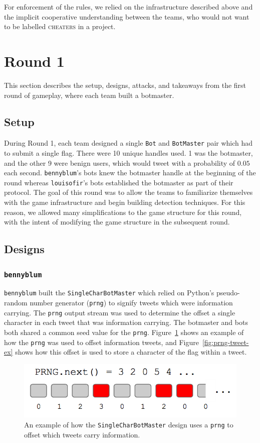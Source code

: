 \documentclass[11pt, oneside]{article} %
\numberwithin{equation}{section} %
\numberwithin{figure}{section} %
\numberwithin{table}{section} %
\renewcommand{\c}[1]{\texttt{#1}}
\newcommand{\teambb}{\c{bennyblum}}
\newcommand{\teamol}{\c{louisofir}}
\begin{document}
		For enforcement of the rules, we relied on the infrastructure described above and the implicit cooperative understanding between the teams, who would not want to be labelled \textsc{cheaters} in a project.

\section{Round 1}
	This section describes the setup, designs, attacks, and takeaways from the first round of gameplay, where each team built a botmaster.

	\subsection{Setup}
		During Round 1, each team designed a single \c{Bot} and \c{BotMaster} pair which had to submit a single flag. There were 10 unique handles used. 1 was the botmaster, and the other 9 were benign users, which would tweet with a probability of $0.05$ each second. \teambb{}'s bots knew the botmaster handle at the beginning of the round whereas \teamol{}'s bots established the botmaster as part of their protocol. The goal of this round was to allow the teams to familiarize themselves with the game infrastructure and begin building detection techniques. For this reason, we allowed many simplifications to the game structure for this round, with the intent of modifying the game structure in the subsequent round. 

	\subsection{Designs}
	
		\subsubsection{\teambb{}}
			\teambb{} built the \c{SingleCharBotMaster} which relied on Python's pseudo-random number generator (\c{prng}) to signify tweets which were information carrying. The \c{prng} output stream was used to determine the offset a single character in each tweet that was information carrying. The botmaster and bots both shared a common seed value for the \c{prng}. Figure~\ref{fig:prng} shows an example of how the \c{prng} was used to offset information tweets, and Figure~\ref{fig:prng-tweet-ex} shows how this offset is used to store a character of the flag within a tweet.

		\begin{figure}[H]
		    \center\includegraphics[scale=0.70]{resources/prng.png}
		    \caption{An example of how the \c{SingleCharBotMaster} design uses a \c{prng} to offset which tweets carry information.}
		    \label{fig:prng}
		 \end{figure}
\end{document}
